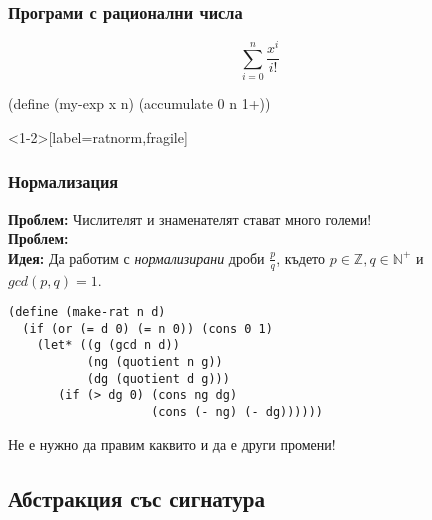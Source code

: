 \documentclass[alsotrans,beameroptions={aspectratio=169}]{beamerswitch}
\begin{document}
\begin{frame}[label=ratprog,fragile]
  \frametitle{Програми с рационални числа}

  \begin{equation*}
    \sum_{i=0}^n \frac{x^i}{i!}
  \end{equation*}

  \onslide<+->

  \begin{overprint}
\begin{semiverbatim}
(define (my-exp x n)
  (accumulate
      0 n
     1+))
\end{semiverbatim}
  \end{overprint}
\end{frame}

\begin{frame}<1-2>[label=ratnorm,fragile]
  \frametitle{Нормализация}

  \textbf{Проблем:} Числителят и знаменателят стават много големи!\\[2ex]
  \pause
  \textbf{Проблем:} \\[2ex]
  \pause
  \textbf{Идея:} Да работим с \emph{нормализирани} дроби $\frac p q$, където $p \in \mathbb Z, q \in \mathbb N^+$ и $gcd(p,q) = 1$.
  \pause
\begin{lstlisting}
(define (make-rat n d)
  (if (or (= d 0) (= n 0)) (cons 0 1)
    (let* ((g (gcd n d))
           (ng (quotient n g))
           (dg (quotient d g)))
       (if (> dg 0) (cons ng dg)
                    (cons (- ng) (- dg))))))
\end{lstlisting}
  \pause
  \alert{Не е нужно да правим каквито и да е други промени!}
\end{frame}



\subsection{Абстракция със сигнатура}
\end{document}
